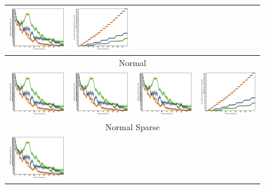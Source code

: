 \documentclass{article}
\renewcommand\[{\begin{equation}}
\renewcommand\]{\end{equation}}
\begin{document}
\begin{figure}[b]
{\begin{tabular}{cccc}
        \includegraphics[width=10em]{figures/loss} &
        \includegraphics[width=10em]{figures/time}
        \\
        \hline
        \multicolumn{4}{c}{{\sc Normal}}
        \\
        \includegraphics[width=10em]{figures/loss} &
        \includegraphics[width=10em]{figures/loss} &
        \includegraphics[width=10em]{figures/loss} &
        \includegraphics[width=10em]{figures/time}
        \\
        \hline
        \multicolumn{4}{c}{{\sc Normal Sparse}}
        \\
        \includegraphics[width=10em]{figures/loss} &

\end{tabular}}
\end{figure}
\end{document}

